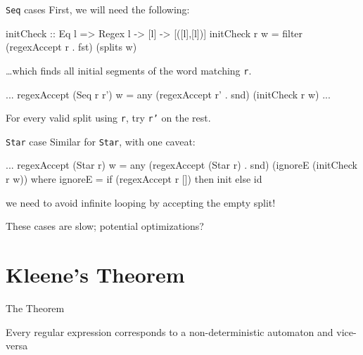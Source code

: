\documentclass{beamer}
\begin{document}
\begin{frame}[fragile]{\texttt{Seq} cases}
  First, we will need the following:
\begin{code}
initCheck :: Eq l => Regex l -> [l] -> [([l],[l])]
initCheck r w = filter (regexAccept r . fst) (splits w)
\end{code}\vspace{1em}
 \ldots which finds all initial segments of the word matching \texttt{r}.
\begin{code}
...
regexAccept (Seq r r') w = any (regexAccept r' . snd)
                               (initCheck r w)
...
\end{code}\vspace{1em}
For every valid split using \texttt{r}, try \texttt{r'} on the rest.
\end{frame}

\begin{frame}[fragile]{\texttt{Star} case}
Similar for \texttt{Star}, with one caveat:
\begin{code}
...
regexAccept (Star r) w = any (regexAccept (Star r) . snd)
                             (ignoreE (initCheck r w))
  where ignoreE = if (regexAccept r []) then init else id 
\end{code}\vspace{1em}
we need to avoid infinite looping by accepting the empty split!\vspace{2em}

These cases are slow; potential optimizations?
\end{frame}

\section{Kleene's Theorem}
\begin{frame}{The Theorem}
	\large
	\begin{theorem}
		Every regular expression corresponds to a non-deterministic automaton and vice-versa
	\end{theorem}
\end{frame}
\end{document}
